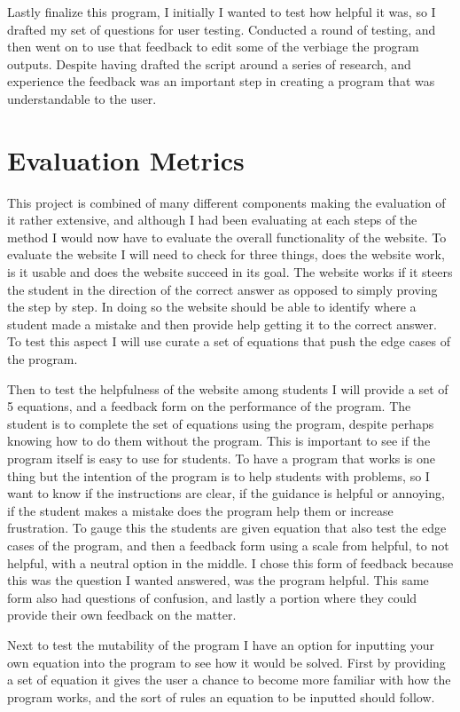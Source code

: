 \documentclass[10pt,twocolumn]{article}
\begin{document}
Lastly finalize this program, I initially I wanted to test how helpful it was, so I drafted my set of questions for user testing. Conducted a round of testing, and then went on to use that feedback to edit some of the verbiage the program outputs. Despite having drafted the script around a series of research, and experience the feedback was an important step in creating a program that was understandable to the user.
\section{Evaluation Metrics}

This project is combined of many different components making the evaluation of it rather extensive, and although I had been evaluating at each steps of the method I would now have to evaluate the overall functionality of the website. To evaluate the website I will need to check for three things, does the website work, is it usable and does the website succeed in its goal. The website works if it steers the student in the direction of the correct answer as opposed to simply proving the step by step. In doing so the website should be able to identify where a student made a mistake and then provide help getting it to the correct answer. To test this aspect I will use curate a set of equations that push the edge cases of the program. 

Then to test the helpfulness of the website among students I will provide a set of 5 equations, and a feedback form on the performance of the program. The student is to complete the set of equations using the program, despite perhaps knowing how to do them without the program. This is important to see if the program itself is easy to use for students. To have a program that works is one thing but the intention of the program is to help students with problems, so I want to know if the instructions are clear, if the guidance is helpful or annoying, if the student makes a mistake does the program help them or increase frustration. To gauge this the students are given equation that also test the edge cases of the program, and then a feedback form using a scale from helpful, to not helpful, with a neutral option in the middle. I chose this form of feedback because this was the question I wanted answered, was the program helpful. This same form also had questions of confusion, and lastly a portion where they could provide their own feedback on the matter. 

Next to test the mutability of the program I have an option for inputting your own equation into the program to see how it would be solved. First by providing a set of equation it gives the user a chance to become more familiar with how the program works, and the sort of rules an equation to be inputted should follow. 
\end{document}
